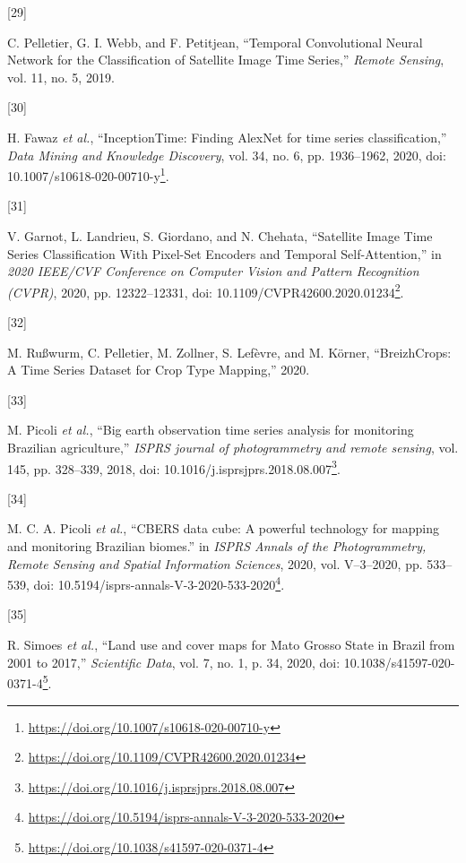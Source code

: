 \documentclass[
  11pt,
]{report}
\newlength{\cslhangindent}
\newlength{\csllabelwidth}
\newlength{\cslentryspacingunit} %
\newenvironment{CSLReferences}[2] %
 {%
  \setlength{\parindent}{0pt}
  \ifodd #1
  \let\oldpar\par
  \def\par{\hangindent=\cslhangindent\oldpar}
  \fi
  \setlength{\parskip}{#2\cslentryspacingunit}
 }%
 {}
\newcommand{\CSLLeftMargin}[1]{\parbox[t]{\csllabelwidth}{#1}}
\newcommand{\CSLRightInline}[1]{\parbox[t]{\linewidth - \csllabelwidth}{#1}\break}
\renewcommand{\href}[2]{#2\footnote{\url{#1}}}
\begin{document}
\begin{CSLReferences}{0}{0}
\leavevmode{}%
\CSLLeftMargin{{[}29{]} }%
\CSLRightInline{C. Pelletier, G. I. Webb, and F. Petitjean, {``Temporal
{Convolutional Neural Network} for the {Classification} of {Satellite
Image Time Series},''} \emph{Remote Sensing}, vol. 11, no. 5, 2019.}

\leavevmode{}%
\CSLLeftMargin{{[}30{]} }%
\CSLRightInline{H. Fawaz \emph{et al.}, {``{InceptionTime}: {Finding
AlexNet} for time series classification,''} \emph{Data Mining and
Knowledge Discovery}, vol. 34, no. 6, pp. 1936--1962, 2020, doi:
\href{https://doi.org/10.1007/s10618-020-00710-y}{10.1007/s10618-020-00710-y}.}

\leavevmode{}%
\CSLLeftMargin{{[}31{]} }%
\CSLRightInline{V. Garnot, L. Landrieu, S. Giordano, and N. Chehata,
{``Satellite {Image Time Series Classification With Pixel-Set Encoders}
and {Temporal Self-Attention},''} in \emph{2020 {IEEE}/{CVF Conference}
on {Computer Vision} and {Pattern Recognition} ({CVPR})}, 2020, pp.
12322--12331, doi:
\href{https://doi.org/10.1109/CVPR42600.2020.01234}{10.1109/CVPR42600.2020.01234}.}

\leavevmode{}%
\CSLLeftMargin{{[}32{]} }%
\CSLRightInline{M. Rußwurm, C. Pelletier, M. Zollner, S. Lefèvre, and M.
Körner, {``{BreizhCrops}: {A Time Series Dataset} for {Crop Type
Mapping},''} 2020.}

\leavevmode{}%
\CSLLeftMargin{{[}33{]} }%
\CSLRightInline{M. Picoli \emph{et al.}, {``Big earth observation time
series analysis for monitoring {Brazilian} agriculture,''} \emph{ISPRS
journal of photogrammetry and remote sensing}, vol. 145, pp. 328--339,
2018, doi:
\href{https://doi.org/10.1016/j.isprsjprs.2018.08.007}{10.1016/j.isprsjprs.2018.08.007}.}

\leavevmode{}%
\CSLLeftMargin{{[}34{]} }%
\CSLRightInline{M. C. A. Picoli \emph{et al.}, {``{CBERS} data cube: A
powerful technology for mapping and monitoring {Brazilian} biomes.''} in
\emph{{ISPRS Annals} of the {Photogrammetry}, {Remote Sensing} and
{Spatial Information Sciences}}, 2020, vol. V--3--2020, pp. 533--539,
doi:
\href{https://doi.org/10.5194/isprs-annals-V-3-2020-533-2020}{10.5194/isprs-annals-V-3-2020-533-2020}.}

\leavevmode{}%
\CSLLeftMargin{{[}35{]} }%
\CSLRightInline{R. Simoes \emph{et al.}, {``Land use and cover maps for
{Mato Grosso State} in {Brazil} from 2001 to 2017,''} \emph{Scientific
Data}, vol. 7, no. 1, p. 34, 2020, doi:
\href{https://doi.org/10.1038/s41597-020-0371-4}{10.1038/s41597-020-0371-4}.}


\end{CSLReferences}
\end{document}
